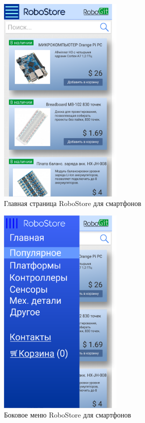 \documentclass[12pt, a4paper]{article}
\begin{document}
\begin{figure}[H]
  \centering
  \includegraphics[width=6cm]{png/store_main_smart.png}
  \caption{Главная страница RoboStore для смартфонов}
\end{figure}

\begin{figure}[H]
  \centering
  \includegraphics[width=6cm]{png/store_menu_smart.png}
  \caption{Боковое меню RoboStore для смартфонов}
\end{figure}
\end{document}
